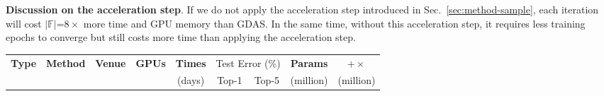 \documentclass[10pt,twocolumn,letterpaper]{article}
\def\Secref#1{Sec.~\ref{#1}}
\def\sF{{\mathbb{F}}}
\begin{document}
\textbf{Discussion on the acceleration step}. If we do not apply the acceleration step introduced in \Secref{sec:method-sample}, each iteration will cost $|\sF|\text{=}8\times$ more time and GPU memory than GDAS. In the same time, without this acceleration step, it requires less training epochs to converge but still costs more time than applying the acceleration step.







\begin{table*}[t!]
\centering
\setlength{\tabcolsep}{4.5pt}
\begin{tabular}{| c | l | c | c | c | c | c | c | c |} \hline\hline

  \multirow{2}{*}{\textbf{Type}} &  \multirow{2}{*}{\textbf{Method}} & \multirow{2}{*}{\textbf{Venue}} & \multirow{2}{*}{\textbf{GPUs}} & \textbf{Times} & \multicolumn{2}{c|}{Test Error (\%)} & \textbf{Params} & $+\times$  \\ \cline{6-7}
    &  & & & (days) & Top-1 & Top-5 & (million) & (million) \\ \hline


\end{tabular}
\end{table*}
\end{document}
